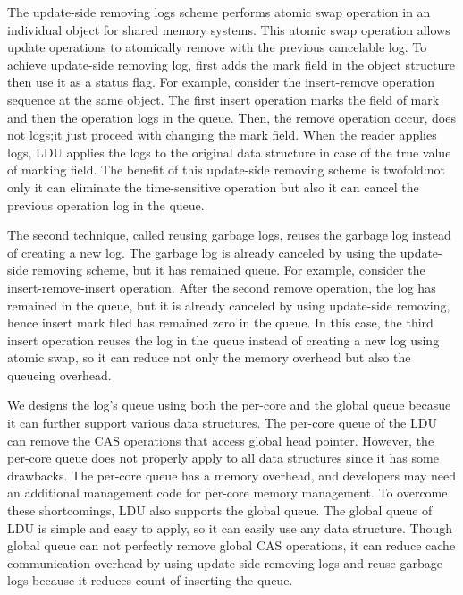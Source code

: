 The update-side removing logs scheme performs atomic swap operation in an
individual object for shared memory systems.
This atomic swap operation allows update operations to atomically remove with the
previous cancelable log.
To achieve update-side removing log, first adds the mark field in the object
structure then use it as a status flag. 
For example, consider the insert-remove operation sequence at the same object.
The first insert operation marks the field of mark and then the operation logs
in the queue.
Then, the remove operation occur, \LDU does not logs;it just proceed with
changing the mark field.
When the reader applies logs, LDU applies the logs to the original data
structure in case of the true value of marking field.
The benefit of this update-side removing scheme is twofold:not only it can
eliminate the time-sensitive operation but also it can cancel the previous
operation log in the queue.


The second technique, called reusing garbage logs, reuses the garbage log
instead of creating a new log.
The garbage log is already canceled by using the update-side removing scheme,
but it has remained queue.
For example, consider the insert-remove-insert operation.
After the second remove operation, the log has remained in the queue, but it is 
already canceled by using update-side removing, hence insert mark filed
has remained zero in the queue.
In this case, the third insert operation reuses the log in the queue instead of 
creating a new log using atomic swap, so it can reduce not only the memory
overhead but also the queueing overhead.

We designs the log's queue using both the per-core and the global queue becasue
it can further support various data structures.
The per-core queue of the LDU can remove the CAS operations that access global
head pointer. 
However, the per-core queue does not properly apply to all data structures since
it has some drawbacks.
The per-core queue has a memory overhead, and developers may need
an additional management code for per-core memory management.
To overcome these shortcomings, LDU also supports the global queue.
The global queue of LDU is simple and easy to apply, so it can easily use any
data structure.
Though global queue can not perfectly remove global CAS operations, it can
reduce cache communication overhead by using update-side removing
logs and reuse garbage logs because it reduces count of inserting the
queue.

